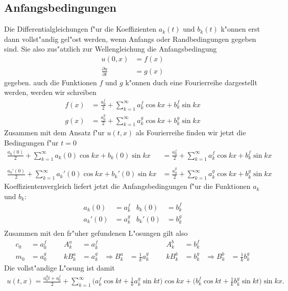 \subsection{Anfangsbedingungen}
Die Differentialgleichungen f"ur die Koeffizienten $a_k(t)$ und $b_k(t)$
k"onnen erst dann vollst"andig gel"ost werden, wenn Anfangs oder Randbedingungen
gegeben sind. Sie also zus"atzlich zur Wellengleichung die Anfangsbedingung
\begin{align*}
u(0,x)&=f(x)\\
\frac{\partial u}{\partial t}&=g(x)
\end{align*}
gegeben. auch die Funktionen $f$ und $g$ k"onnen duch eine Fourierreihe
dargestellt werden, werden wir schreiben
\begin{align*}
f(x)&=\frac{a_0^f}2+\sum_{k=1}^\infty a_k^f\cos kx+b_k^f\sin kx\\
g(x)&=\frac{a_0^g}2+\sum_{k=1}^\infty a_k^g\cos kx+b_k^g\sin kx
\end{align*}
Zusammen mit dem Ansatz f"ur $u(t,x)$ als Fourierreihe finden wir jetzt
die Bedingungen f"ur $t=0$
\begin{align*}
\frac{a_0(0)}2+\sum_{k=1}^\infty a_k(0)\cos kx +b_k(0)\sin kx
&=
\frac{a_0^f}2+\sum_{k=1}^\infty a_k^f\cos kx+b_k^f\sin kx\\
\\
\frac{a_0'(0)}2+\sum_{k=1}^\infty a_k'(0)\cos kx+b_k'(0)\sin kx
&=
\frac{a_0^g}2+\sum_{k=1}^\infty a_k^g\cos kx+b_k^g\sin kx
\end{align*}
Koeffizientenvergleich liefert jetzt die Anfangsbedingungen f"ur die
Funktionen $a_k$ und $b_k$:
\begin{align*}
a_k(0)&=a_k^f&b_k(0)&=b_k^f\\
a_k'(0)&=a_k^g&b_k'(0)&=b_k^g\\
\end{align*}
Zusammen mit den fr"uher gefundenen L"osungen gilt also
\begin{align*}
c_0&=a_0^f&&&A_k^a&=a_k^f&&&&&A_k^b&=b_k^f\\
m_0&=a_0^g&&&kB_k^a&=a_k^g&\Rightarrow B_k^a&=\frac1ka_k^g&&&kB_k^b&=b_k^g&\Rightarrow B_k^b&=\frac1kb_k^g
\end{align*}
Die vollst"andige L"osung ist damit
\begin{align*}
u(t,x)=\frac{a_0^gt+a_0^f}2
+\sum_{k=1}^\infty
\biggl(a_k^f\cos kt+\frac1ka_k^g\sin kt\biggr)\cos kx
+
\biggl(b_k^f\cos kt+\frac1kb_k^g\sin kt\biggr)\sin kx.
\end{align*}

